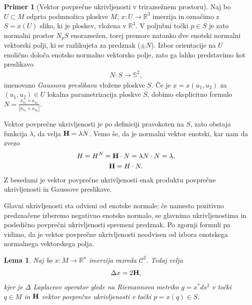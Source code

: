 \documentclass[12pt,a4paper,twoside]{article}
\theoremstyle{definition} %
\newtheorem{primer}[definicija]{Primer}
\theoremstyle{plain} %
\newtheorem{lema}[definicija]{Lema}
\numberwithin{equation}{section}  %
\newcommand{\R}{\mathbb R}
\begin{document}
\begin{primer}[Vektor povprečne ukrivljenosti v trirazsežnem prostoru]
Naj bo $U \subset M$ odprta podmnožica ploskve $M$, $x \colon U \to \mathbb{R}^{3}$ imerzija in označimo z $S = x(U)$ sliko, ki je ploskev, vložena v $\mathbb{R}^3$. V poljubni točki $p \in S$ je zato normalni prostor $N_{p}S$ enorazsežen, torej premore natanko dve enotski normalni vektorski polji, ki se razlikujeta za predznak ($\pm N$). Izbor orientacije na $U$ enolično določa enotsko normalno vektorsko polje, zato ga lahko predstavimo kot preslikavo
\begin{gather*}
N \colon S \to \mathbb{S}^{2},
\end{gather*}
imenovano \emph{Gaussova preslikava} vložene ploskve $S$. Če je $x = x(u_{1},u_{2})$ za $(u_{1},u_{2}) \in U$ lokalna parametrizacija ploskve $S$, dobimo eksplicitno formulo $N = \frac{x_{u_{1}} \times x_{u_{2}}}{|x_{u_{1}} \times x_{u_{2}}|}$.

Vektor povprečne ukrivljenosti je po definiciji pravokoten na $S$, zato obstaja funkcija $\lambda$, da velja $\textbf{\textup{H}} = \lambda N$. Vemo še, da je normalni vektor enotski, kar nam da zvezo
\begin{gather}
H = H^{N} = \textbf{\textup{H}} \cdot N = \lambda N \cdot N = \lambda, \nonumber \\
\textbf{\textup{H}} = H \cdot N.
\end{gather}
Z besedami je vektor povprečne ukrivljenosti enak produktu povprečne ukrivljenosti in Gaussove preslikave.

Glavni ukrivljenosti sta odvisni od enotske normale; če namesto pozitivno predznačene izberemo negativno enotsko normalo, se glavnima ukrivljenostima in posledično povprečni ukrivljenosti spremeni predznak. Po zgornji formuli pa vidimo, da je vektor povprečne ukrivljenosti neodvisen od izbora enotskega normalnega vektorskega polja.
\end{primer}

\begin{lema} \label{lema:laplace=2H}
Naj bo $x \colon M \to \R^{n}$ imerzija razreda $\mathcal{C}^2$. Tedaj velja
\begin{equation}
\Delta{x} = 2 \textbf{\textup{H}},
\end{equation}
kjer je $\Delta$ Laplaceov operator glede na Riemannovo metriko $g = x^{*}ds^2$ v točki $q \in M$ in $\textbf{\textup{H}}$ vektor povprečne ukrivljenosti v točki $p = x(q) \in S$.
\end{lema}
\end{document}
